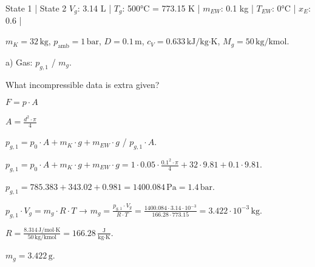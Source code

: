 State 1 | State 2  
\( V_g \): 3.14 L |  
\( T_g \): 500°C = 773.15 K |  
\( m_{EW} \): 0.1 kg |  
\( T_{EW} \): 0°C |  
\( x_E \): 0.6 |  

\( m_K = 32 \, \text{kg} \), \( p_{\text{amb}} = 1 \, \text{bar} \), \( D = 0.1 \, \text{m} \), \( c_V = 0.633 \, \text{kJ/kg·K} \), \( M_g = 50 \, \text{kg/kmol} \).  

a) Gas: \( p_{g,1} \) / \( m_g \).  

What incompressible data is extra given?  

\( F = p \cdot A \)  

\( A = \frac{d^2 \cdot \pi}{4} \)  

\( p_{g,1} = p_0 \cdot A + m_K \cdot g + m_{EW} \cdot g \) / \( p_{g,1} \cdot A \).  

\( p_{g,1} = p_0 \cdot A + m_K \cdot g + m_{EW} \cdot g = 1 \cdot 0.05 \cdot \frac{0.1^2 \cdot \pi}{4} + 32 \cdot 9.81 + 0.1 \cdot 9.81 \).  

\( p_{g,1} = 785.383 + 343.02 + 0.981 = 1400.084 \, \text{Pa} = 1.4 \, \text{bar} \).  

\( p_{g,1} \cdot V_g = m_g \cdot R \cdot T \) → \( m_g = \frac{p_{g,1} \cdot V_g}{R \cdot T} = \frac{1400.084 \cdot 3.14 \cdot 10^{-3}}{166.28 \cdot 773.15} = 3.422 \cdot 10^{-3} \, \text{kg} \).  

\( R = \frac{8.314 \, \text{J/mol·K}}{50 \, \text{kg/kmol}} = 166.28 \, \frac{\text{J}}{\text{kg·K}} \).  

\( m_g = 3.422 \, \text{g} \).